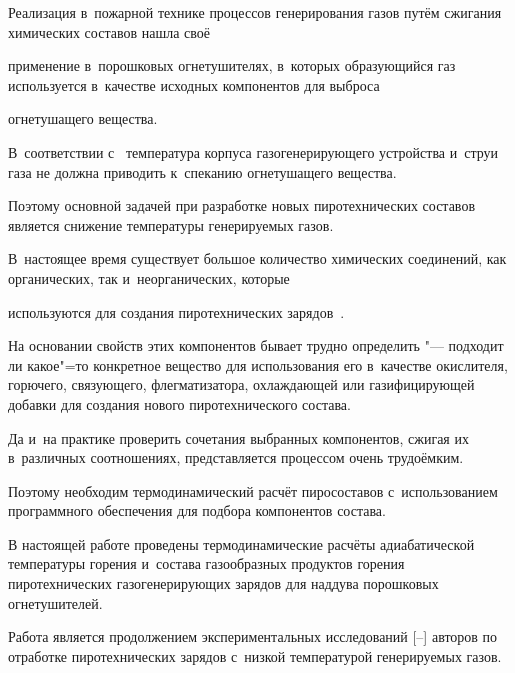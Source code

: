 \maketitle







 Реализация в~пожарной технике процессов генерирования газов путём сжигания химических составов нашла своё

применение в~порошковых огнетушителях, в~которых образующийся газ используется в~качестве исходных компонентов для выброса

огнетушащего вещества. 

В~соответствии с~\cite{altuhov:bib1,altuhov:bib2} температура корпуса газогенерирующего устройства и~струи газа не должна приводить к~спеканию огнетушащего вещества. 

Поэтому основной задачей при разработке новых пиротехнических составов является снижение температуры генерируемых газов.



В~настоящее время существует большое количество химических соединений, как органических, так и~неорганических, которые

используются для создания пиротехнических зарядов~\cite{altuhov:bib3,altuhov:bib4}. 

На основании свойств этих компонентов бывает трудно определить "--- подходит ли какое"=то конкретное вещество для использования его в~качестве окислителя, горючего, связующего, флегматизатора, охлаждающей или газифицирующей добавки для создания нового пиротехнического состава. 

Да и~на практике проверить сочетания выбранных компонентов, сжигая их в~различных соотношениях, представляется процессом очень трудоёмким. 

Поэтому необходим термодинамический расчёт пиросоставов с~использованием программного обеспечения для подбора компонентов состава.



В настоящей работе проведены термодинамические расчёты адиабатической температуры горения и~состава газообразных продуктов горения пиротехнических газогенерирующих зарядов для наддува порошковых огнетушителей. 

Работа является продолжением экспериментальных исследований [--] авторов по отработке пиротехнических зарядов с~низкой температурой генерируемых газов.





